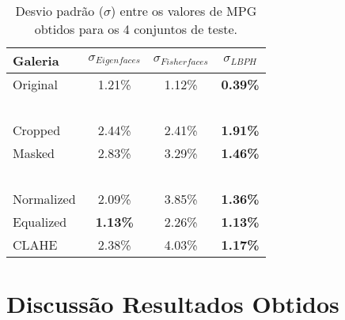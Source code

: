 \begin{center}
\begin{table}
    \begin{center}
    \caption{Desvio padrão ($\sigma$) entre os valores de MPG obtidos para os 4 conjuntos de teste.}
    \begin{tabular}{l|ccc}
    Galeria    & $\sigma_{Eigenfaces}$ & $\sigma_{Fisherfaces}$ & $\sigma_{LBPH}$ \\ 
    \hline\hline
    Original   & 1.21\%          & 1.12\%           & \textbf{0.39\%}    \\
    ~ \\
    Cropped    & 2.44\%          & 2.41\%           & \textbf{1.91\%}    \\
    Masked     & 2.83\%          & 3.29\%           & \textbf{1.46\%}    \\
    ~ \\
    Normalized & 2.09\%          & 3.85\%           & \textbf{1.36\%}    \\
    Equalized  &\textbf{ 1.13\%} & 2.26\%           & \textbf{1.13\%}    \\
    CLAHE      & 2.38\%          & 4.03\%           & \textbf{1.17\%}    \\
    \hline\hline
    \end{tabular}
    \label{tab:desviopadrao}
    \end{center}
\end{table}
\end{center}

\section{Discussão Resultados Obtidos} \label{sec:discussao}
